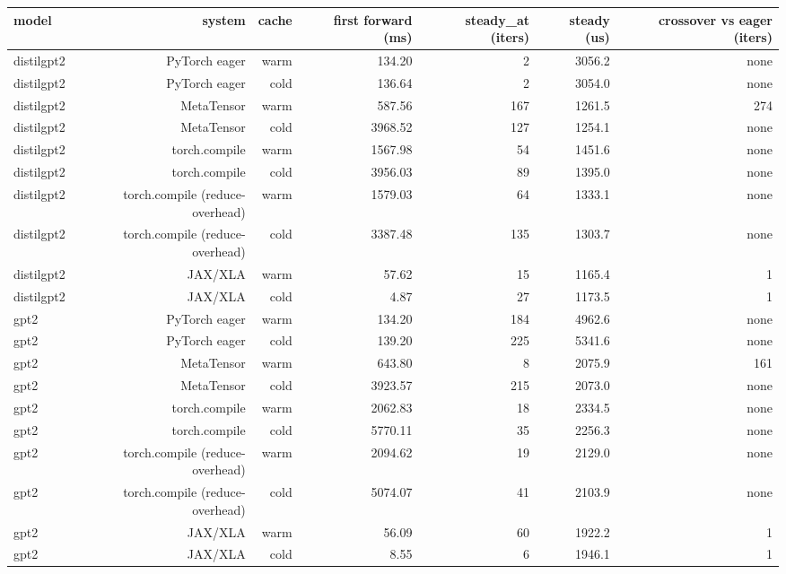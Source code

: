 \begin{tabular}{lrrrrrr}
\toprule
model & system & cache & first forward (ms) & steady\_at (iters) & steady (us) & crossover vs eager (iters) \\
\midrule
distilgpt2 & PyTorch eager & warm & 134.20 & 2 & 3056.2 & none \\
distilgpt2 & PyTorch eager & cold & 136.64 & 2 & 3054.0 & none \\
distilgpt2 & MetaTensor & warm & 587.56 & 167 & 1261.5 & 274 \\
distilgpt2 & MetaTensor & cold & 3968.52 & 127 & 1254.1 & none \\
distilgpt2 & torch.compile & warm & 1567.98 & 54 & 1451.6 & none \\
distilgpt2 & torch.compile & cold & 3956.03 & 89 & 1395.0 & none \\
distilgpt2 & torch.compile (reduce-overhead) & warm & 1579.03 & 64 & 1333.1 & none \\
distilgpt2 & torch.compile (reduce-overhead) & cold & 3387.48 & 135 & 1303.7 & none \\
distilgpt2 & JAX/XLA & warm & 57.62 & 15 & 1165.4 & 1 \\
distilgpt2 & JAX/XLA & cold & 4.87 & 27 & 1173.5 & 1 \\
gpt2 & PyTorch eager & warm & 134.20 & 184 & 4962.6 & none \\
gpt2 & PyTorch eager & cold & 139.20 & 225 & 5341.6 & none \\
gpt2 & MetaTensor & warm & 643.80 & 8 & 2075.9 & 161 \\
gpt2 & MetaTensor & cold & 3923.57 & 215 & 2073.0 & none \\
gpt2 & torch.compile & warm & 2062.83 & 18 & 2334.5 & none \\
gpt2 & torch.compile & cold & 5770.11 & 35 & 2256.3 & none \\
gpt2 & torch.compile (reduce-overhead) & warm & 2094.62 & 19 & 2129.0 & none \\
gpt2 & torch.compile (reduce-overhead) & cold & 5074.07 & 41 & 2103.9 & none \\
gpt2 & JAX/XLA & warm & 56.09 & 60 & 1922.2 & 1 \\
gpt2 & JAX/XLA & cold & 8.55 & 6 & 1946.1 & 1 \\
\bottomrule
\end{tabular}
